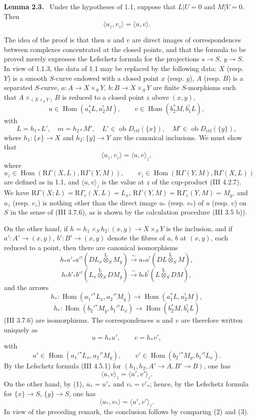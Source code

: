 \documentclass[11pt]{article}
\newenvironment{statement}[1]{\par\medskip\noindent\textbf{#1.}\ }{\par\medskip}
\DeclareMathOperator{\Hom}{Hom}
\providecommand{\lten}{\overset{\mathrm L}{\otimes}}
\providecommand{\Ob}{\operatorname{ob}}
\providecommand{\Hom}{\operatorname{Hom}}
\providecommand{\lten}{\overset{\mathrm L}{\otimes}}
\providecommand{\lten}{\overset{\mathrm L}{\otimes}}
\providecommand{\Ob}{\operatorname{ob}}
\providecommand{\lten}{\overset{\mathrm L}{\otimes}}
\providecommand{\lten}{\overset{\mathrm L}{\otimes}}
\providecommand{\Ob}{\operatorname{Ob}}
\providecommand{\lten}{\overset{\mathrm L}{\otimes}}
\providecommand{\Hom}{\operatorname{Hom}}
\providecommand{\Ob}{\operatorname{ob}}
\providecommand{\Ob}{\operatorname{Ob}}
\providecommand{\lten}{\overset{\mathrm L}{\otimes}}
\begin{document}
\begin{statement}{Lemma 2.3}
Under the hypotheses of 1.1, suppose that $L|U=0$ and $M|V=0$. Then
\[
\langle u_z,v_z\rangle=\langle u,v\rangle .
\]
\end{statement}

The idea of the proof is that then $u$ and $v$ are direct images of correspondences between complexes concentrated at the closed points, and that the formula to be proved merely expresses the Lefschetz formula for the projections $s\to S$, $y\to S$. In view of 1.1.3, the data of 1.1 may be replaced by the following data: $X$ (resp. $Y$) is a smooth $S$-curve endowed with a closed point $x$ (resp. $y$), $A$ (resp. $B$) is a separated $S$-curve, $a:A\to X\times_S Y$, $b:B\to X\times_S Y$ are finite $S$-morphisms such that $A\times_{(X\times_SY)}B$ is reduced to a closed point $z$ above $(x,y)$,
\[
u\in\Hom(a_1^*L,a_2^!M),\qquad v\in\Hom(b_2^*M,b_1^!L),
\]
with
\[
L=h_{1*}L',\quad m=h_{2*}M',\quad
L'\in\Ob D_{\mathrm{ctf}}(\{x\}),\quad M'\in\Ob D_{\mathrm{ctf}}(\{y\}),
\]
where $h_1:\{x\}\to X$ and $h_2:\{y\}\to Y$ are the canonical inclusions. We must show that
\[
\langle u_z,v_z\rangle=\langle u,v\rangle_z,
\]
where
\[
u_z\in\Hom(\mathrm R\Gamma(X,L),\mathrm R\Gamma(Y,M)),\qquad
v_z\in\Hom(\mathrm R\Gamma(Y,M),\mathrm R\Gamma(X,L))
\]
are defined as in 1.1, and $\langle u,v\rangle_z$ is the value at $z$ of the cup-product (III 4.2.7). We have $\mathrm R\Gamma(X;L)=\mathrm R\Gamma_c(X,L)=L_x$, $\mathrm R\Gamma(Y,M)=\mathrm R\Gamma_c(Y,M)=M_y$, and $u_z$ (resp. $v_z$) is nothing other than the direct image $u_*$ (resp. $v_*$) of $u$ (resp. $v$) on $S$ in the sense of (III 3.7.6), as is shown by the calculation procedure (III 3.5 b)).

On the other hand, if $h=h_1\times_Sh_2:(x,y)\to X\times_SY$ is the inclusion, and if $a':A'\to(x,y)$, $b':B'\to(x,y)$ denote the fibres of $a$, $b$ at $(x,y)$, each reduced to a point, then there are canonical isomorphisms
\[
h_*a'_*a'{}^!(DL_x\lten_SM_y)
 \xrightarrow{\sim} a_*a^!(DL\lten_SM),
\]
\[
h_*b'_*b'{}^!(L_x\lten_SDM_y)
 \xrightarrow{\sim} b_*b^!(L\lten_SDM),
\]
and the arrows
\[
h_*:\Hom(a_1'{}^*L_x,a_2'{}^!M_y)\to \Hom(a_1^*L,a_2^!M),
\]
\[
h_*:\Hom(b_2'{}^*M_y,b_1'{}^!L_x)\to \Hom(b_2^*M,b_1^!L)
\]
(III 3.7.6) are isomorphisms. The correspondences $u$ and $v$ are therefore written uniquely as
\begin{equation}\tag{1}
u=h_*u',\qquad v=h_*v',
\end{equation}
with
\[
u'\in\Hom(a_1'{}^*L_x,a_2'{}^!M_y),\qquad
v'\in\Hom(b_2'{}^*M_y,b_1'{}^!L_x).
\]
By the Lefschetz formula (III 4.5.1) for $(h_1,h_2,A'\to A,B'\to B)$, one has
\begin{equation}\tag{2}
\langle u,v\rangle_z=\langle u',v'\rangle_z .
\end{equation}
On the other hand, by (1), $u_*=u'_*$ and $v_*=v'_*$; hence, by the Lefschetz formula for $\{x\}\to S$, $\{y\}\to S$, one has
\begin{equation}\tag{3}
\langle u_*,v_*\rangle=\langle u',v'\rangle_z .
\end{equation}
In view of the preceding remark, the conclusion follows by comparing (2) and (3).
\end{document}
